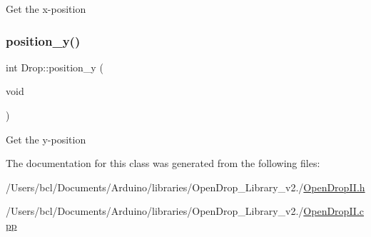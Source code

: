 Get the x-\/position \mbox{\label{class_drop_a7752d271ba81d744a9c503afd9766613}} 
\subsubsection{\texorpdfstring{position\+\_\+y()}{position\_y()}}
{\footnotesize\ttfamily int Drop\+::position\+\_\+y (\begin{DoxyParamCaption}\item[{void}]{ }\end{DoxyParamCaption})}

Get the y-\/position 

The documentation for this class was generated from the following files\+:\begin{DoxyCompactItemize}
\item 
/\+Users/bcl/\+Documents/\+Arduino/libraries/\+Open\+Drop\+\_\+\+Library\+\_\+v2./\mbox{\hyperlink{_open_drop_i_i_8h}{Open\+Drop\+I\+I.\+h}}\item 
/\+Users/bcl/\+Documents/\+Arduino/libraries/\+Open\+Drop\+\_\+\+Library\+\_\+v2./\mbox{\hyperlink{_open_drop_i_i_8cpp}{Open\+Drop\+I\+I.\+cpp}}\end{DoxyCompactItemize}
